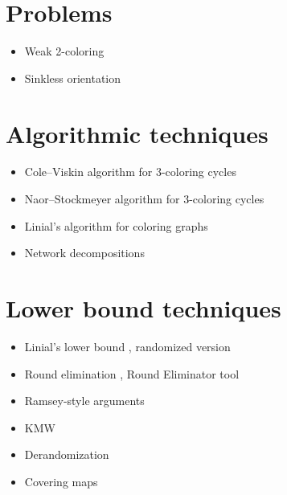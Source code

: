 \documentclass[a4paper,11pt]{article}
\begin{document}
\section{Problems}
\begin{itemize}
    \item Weak 2-coloring \cite{naor-stockmeyer-1995-what-can-be-computed-locally}
    \item Sinkless orientation \cite{brandt-fischer-etal-2016-a-lower-bound-for-the}
\end{itemize}

\section{Algorithmic techniques}
\begin{itemize}
    \item Cole--Viskin algorithm for 3-coloring cycles \cite{cole-vishkin-1986-deterministic-coin-tossing-with,goldberg-plotkin-shannon-1988-parallel-symmetry}
    \item Naor--Stockmeyer algorithm for 3-coloring cycles \cite{naor-stockmeyer-1995-what-can-be-computed-locally}
    \item Linial's algorithm for coloring graphs \cite{linial-1992-locality-in-distributed-graph-algorithms}
    \item Network decompositions \cite{awerbuch-goldberg-etal-1989-network-decomposition-and,rozhon-ghaffari-2020-polylogarithmic-time-deterministic}
\end{itemize}

\section{Lower bound techniques}
\begin{itemize}
    \item Linial's lower bound \cite{linial-1992-locality-in-distributed-graph-algorithms}, randomized version \cite{naor-1991-a-lower-bound-on-probabilistic-algorithms-for}
    \item Round elimination \cite{brandt-2019-an-automatic-speedup-theorem-for,brandt-fischer-etal-2016-a-lower-bound-for-the}, Round Eliminator tool \cite{olivetti-2020-brief-announcement-round-eliminator-a,olivetti-2025-round-eliminator-a-tool-for-automatic}
    \item Ramsey-style arguments \cite{naor-stockmeyer-1995-what-can-be-computed-locally,czygrinow-hanckowiak-wawrzyniak-2008-fast-distributed}
    \item KMW \cite{kuhn-moscibroda-wattenhofer-2004-what-cannot-be,kuhn-moscibroda-wattenhofer-2006-the-price-of-being,kuhn-moscibroda-wattenhofer-2016-local-computation,coupette-lenzen-2021-a-breezing-proof-of-the-kmw-bound}
    \item Derandomization \cite{naor-stockmeyer-1995-what-can-be-computed-locally,chang-kopelowitz-pettie-2019-an-exponential-separation,dahal-d-amore-etal-2023-brief-announcement-distributed}
    \item Covering maps \cite{angluin-1980-local-and-global-properties-in-networks-of,yamashita-kameda-1996-computing-on-anonymous-networks}
\end{itemize}
\end{document}
